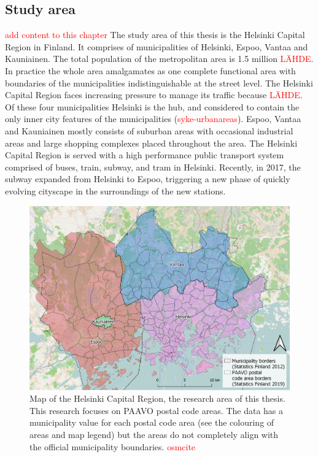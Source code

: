 \newpage
\subsection{Study area}
\justify

\textcolor{red}{add content to this chapter} The study area of this thesis is the Helsinki Capital Region in Finland. It comprises of municipalities of Helsinki, Espoo, Vantaa and Kauniainen. The total population of the metropolitan area is 1.5 million \textcolor{red}{LÄHDE}. In practice the whole area amalgamates as one complete functional area with boundaries of the municipalities indistinguishable at the street level. The Helsinki Capital Region faces increasing pressure to manage its traffic because \textcolor{red}{LÄHDE}. Of these four municipalities Helsinki is the hub, and considered to contain the only inner city features of the municipalities (\textcolor{red}{syke-urbanareas}). Espoo, Vantaa and Kauniainen mostly consists of suburban areas with occasional industrial areas and large shopping complexes placed throughout the area. The Helsinki Capital Region is served with a high performance public transport system comprised of buses, train, subway, and tram in Helsinki. Recently, in 2017, the subway expanded from Helsinki to Espoo, triggering a new phase of quickly evolving cityscape in the surroundings of the new stations.

\begin{figure}[H]%
    \includegraphics[width=\textwidth]{images/thesis_resarea.png}
    \caption[Research area map]{Map of the Helsinki Capital Region, the research area of this thesis. This research focuses on PAAVO postal code areas. The data has a municipality value for each postal code area (see the colouring of areas and map legend) but the areas do not completely align with the official municipality boundaries. \textcolor{red}{osmcite}}%
    \label{fig:thesis_resarea}%
\end{figure}

